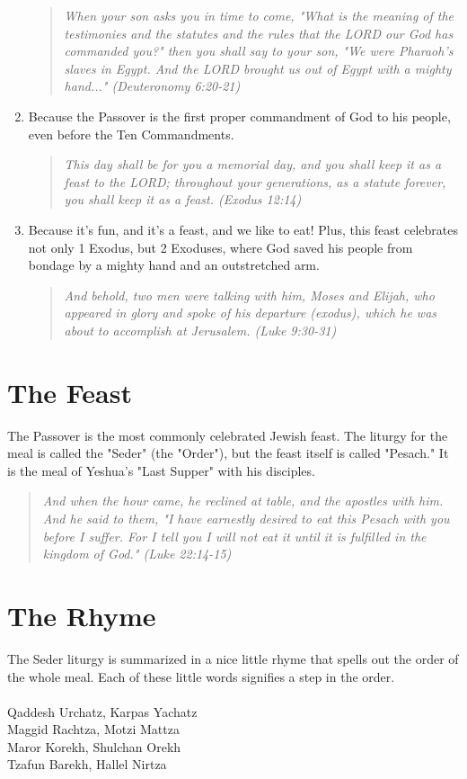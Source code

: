 \documentclass[10pt,oneside,footinclude=true,headinclude=true]{scrbook} %
\newcommand\quot[1]{
	\begin{quote}\textit{\small#1}\end{quote}
}
\begin{document}
\begin{enumerate}
{		\quot{When your son asks you in time to come, "What is the meaning of the testimonies and the statutes and the rules that the LORD our God has commanded you?" then you shall say to your son, "We were Pharaoh's slaves in Egypt. And the LORD brought us out of Egypt with a mighty hand..." (Deuteronomy 6:20-21)}
	}
	\item{
		Because the Passover is the first proper commandment of God to his people, even before the Ten Commandments.
		\quot{This day shall be for you a memorial day, and you shall keep it as a feast to the LORD; throughout your generations, as a statute forever, you shall keep it as a feast. (Exodus 12:14)}
	}
	\item{
		Because it's fun, and it's a feast, and we like to eat! Plus, this feast celebrates not only 1 Exodus, but 2 Exoduses, where God saved his people from bondage by a mighty hand and an outstretched arm.
		\quot{And behold, two men were talking with him, Moses and Elijah, who appeared in glory and spoke of his departure (exodus), which he was about to accomplish at Jerusalem. (Luke 9:30-31)}
	}
\end{enumerate}


\section{The Feast}
The Passover is the most commonly celebrated Jewish feast. The liturgy for the meal is called the "Seder" (the "Order"), but the feast itself is called "Pesach." It is the meal of Yeshua's "Last Supper" with his disciples.

\quot{And when the hour came, he reclined at table, and the apostles with him. And he said to them, "I have earnestly desired to eat this Pesach with you before I suffer. For I tell you I will not eat it until it is fulfilled in the kingdom of God." (Luke 22:14-15)}


\section{The Rhyme}

The Seder liturgy is summarized in a nice little rhyme that spells out the order of the whole meal. Each of these little words signifies a step in the order.\\
\\
Qaddesh Urchatz, Karpas Yachatz\\
Maggid Rachtza, Motzi Mattza\\
Maror Korekh, Shulchan Orekh\\
Tzafun Barekh, Hallel Nirtza
\end{document}
